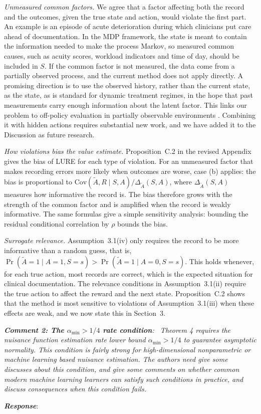 \documentclass[12pt]{article}
\newcommand{\Cov}{{\mbox{Cov}}}
\newcommand{\0}{\boldsymbol{0}}
\theoremstyle{definition}
\newcommand{\reviewcomment}[1]{\par\begingroup\itshape\noindent\textbf{#1}:\ }
\newcommand{\reviewresponse}{\par\endgroup\noindent\textbf{\textit{Response}}:\ }
\begin{document}
\textit{Unmeasured common factors.} We agree that a factor affecting both the record and the outcomes, given the true state and action, would violate the first part. An example is an episode of acute deterioration during which clinicians put care ahead of documentation. In the MDP framework, the state is meant to contain the information needed to make the process Markov, so measured common causes, such as acuity scores, workload indicators and time of day, should be included in $S$. If the common factor is not measured, the data come from a partially observed process, and the current method does not apply directly. A promising direction is to use the observed history, rather than the current state, as the state, as is standard for dynamic treatment regimes, in the hope that past measurements carry enough information about the latent factor. This links our problem to off-policy evaluation in partially observable environments \citep{tennenholtz2020off,shi2022minimax,miao2022off,bennett2024proximal}. Combining it with hidden actions requires substantial new work, and we have added it to the Discussion as future research.

\textit{How violations bias the value estimate.} Proposition~C.2 in the revised Appendix gives the bias of LURE for each type of violation. For an unmeasured factor that makes recording errors more likely when outcomes are worse, case (b) applies: the bias is proportional to $\Cov(\widetilde A,R\mid S,A)/\Delta_{\widetilde A}(S,A)$, where $\Delta_{\widetilde A}(S,A)$ measures how informative the record is. The bias therefore grows with the strength of the common factor and is amplified when the record is weakly informative. The same formulas give a simple sensitivity analysis: bounding the residual conditional correlation by $\rho$ bounds the bias.

\textit{Surrogate relevance.} Assumption~3.1(iv) only requires the record to be more informative than a random guess, that is, $\Pr(\widetilde A=1\mid A=1,S=s)>\Pr(\widetilde A=1\mid A=0,S=s)$. This holds whenever, for each true action, most records are correct, which is the expected situation for clinical documentation. The relevance conditions in Assumption~3.1(ii) require the true action to affect the reward and the next state. Proposition~C.2 shows that the method is most sensitive to violations of Assumption~3.1(iii) when these effects are weak, and we now state this in Section~3.

\reviewcomment{Comment 2: The $\alpha_{\min}>1/4$ rate condition} Theorem 4 requires the nuisance function estimation rate lower bound $\alpha_{\min}>1/4$ to guarantee asymptotic normality. This condition is fairly strong for high-dimensional nonparametric or machine learning based nuisance estimation. The authors need give some discusses about this condition, and give some comments on whether common modern machine learning learners can satisfy such conditions in practice, and discuss consequences when this condition fails.
\reviewresponse
\end{document}
